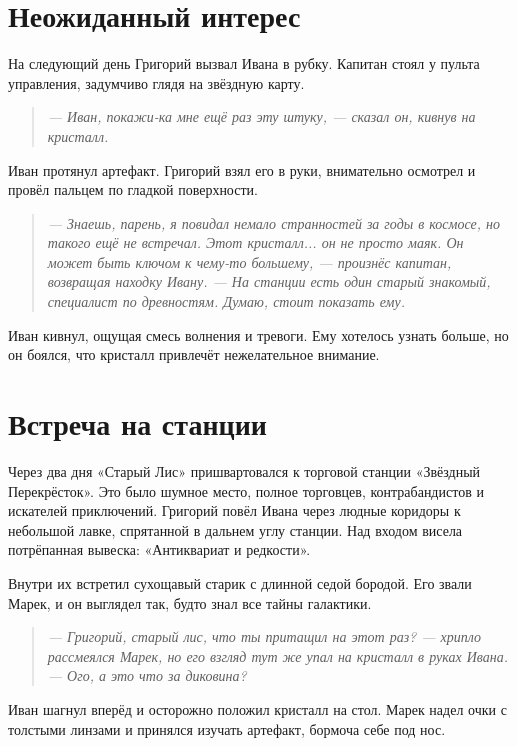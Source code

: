 \documentclass[12pt,a4paper]{book} %
\newenvironment{dialogue}{\begin{quote}\itshape}{\end{quote}}
\begin{document}
\section*{Неожиданный интерес}

На следующий день Григорий вызвал Ивана в рубку. Капитан стоял у пульта управления, задумчиво глядя на звёздную карту.

\begin{dialogue}
--- Иван, покажи-ка мне ещё раз эту штуку, --- сказал он, кивнув на кристалл.
\end{dialogue}

Иван протянул артефакт. Григорий взял его в руки, внимательно осмотрел и провёл пальцем по гладкой поверхности.

\begin{dialogue}
--- Знаешь, парень, я повидал немало странностей за годы в космосе, но такого ещё не встречал. Этот кристалл... он не просто маяк. Он может быть ключом к чему-то большему, --- произнёс капитан, возвращая находку Ивану. --- На станции есть один старый знакомый, специалист по древностям. Думаю, стоит показать ему.
\end{dialogue}

Иван кивнул, ощущая смесь волнения и тревоги. Ему хотелось узнать больше, но он боялся, что кристалл привлечёт нежелательное внимание.

\section*{Встреча на станции}

Через два дня «Старый Лис» пришвартовался к торговой станции «Звёздный Перекрёсток». Это было шумное место, полное торговцев, контрабандистов и искателей приключений. Григорий повёл Ивана через людные коридоры к небольшой лавке, спрятанной в дальнем углу станции. Над входом висела потрёпанная вывеска: «Антиквариат и редкости».

Внутри их встретил сухощавый старик с длинной седой бородой. Его звали Марек, и он выглядел так, будто знал все тайны галактики.

\begin{dialogue}
--- Григорий, старый лис, что ты притащил на этот раз? --- хрипло рассмеялся Марек, но его взгляд тут же упал на кристалл в руках Ивана. --- Ого, а это что за диковина?
\end{dialogue}

Иван шагнул вперёд и осторожно положил кристалл на стол. Марек надел очки с толстыми линзами и принялся изучать артефакт, бормоча себе под нос.
\end{document}
